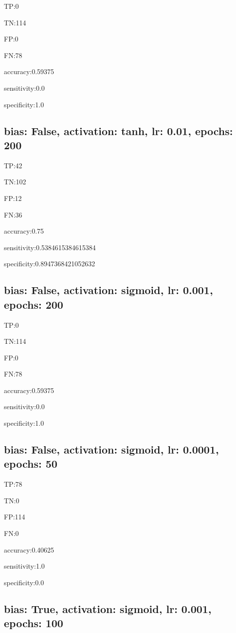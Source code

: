 \documentclass{article}
\begin{document}
TP:0

TN:114

FP:0

FN:78

accuracy:0.59375

sensitivity:0.0

specificity:1.0



\subsection{bias: False, activation: tanh, lr: 0.01, epochs: 200}

TP:42

TN:102

FP:12

FN:36

accuracy:0.75

sensitivity:0.5384615384615384

specificity:0.8947368421052632



\subsection{bias: False, activation: sigmoid, lr: 0.001, epochs: 200}

TP:0

TN:114

FP:0

FN:78

accuracy:0.59375

sensitivity:0.0

specificity:1.0



\subsection{bias: False, activation: sigmoid, lr: 0.0001, epochs: 50}

TP:78

TN:0

FP:114

FN:0

accuracy:0.40625

sensitivity:1.0

specificity:0.0



\subsection{bias: True, activation: sigmoid, lr: 0.001, epochs: 100}
\end{document}
